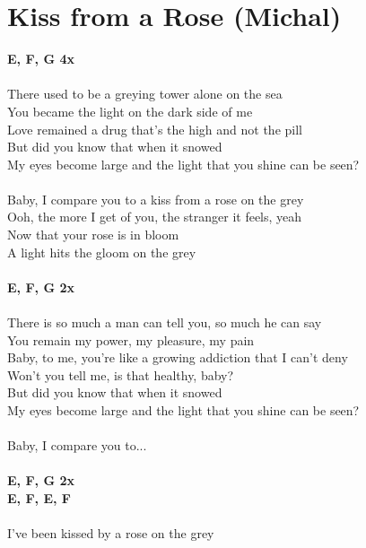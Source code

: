 \section{Kiss from a Rose (Michal)}
\footnotesize\textbf{E\be, F, G 4x}\\
\\
\normalsize
{}There used to be a greying tower alone on the sea\\
You became the light on the dark side of me\\
Love remained a drug that's the high and not the pill\\
But did you know that when it snowed\\
My eyes become large and the light that you shine can be seen?\\
\\
Baby, I compare you to a kiss from a rose on the grey\\
Ooh, the more I get of you, the stranger it feels, yeah\\
Now that your rose is in bloom\\
A light hits the gloom on the grey\\
\\
\footnotesize\textbf{E\be, F, G 2x}\\
\\
\normalsize
There is so much a man can tell you, so much he can say\\
You remain my power, my pleasure, my pain\\
Baby, to me, you're like a growing addiction that I can't deny\\
Won't you tell me, is that healthy, baby?\\
But did you know that when it snowed\\
My eyes become large and the light that you shine can be seen?\\
\\
Baby, I compare you to...\\
\\
\footnotesize\textbf{E\be, F, G 2x\\
E\be, F, E\be, F} \\
\\
\normalsize
{}I've been kissed by a rose on the grey\\
